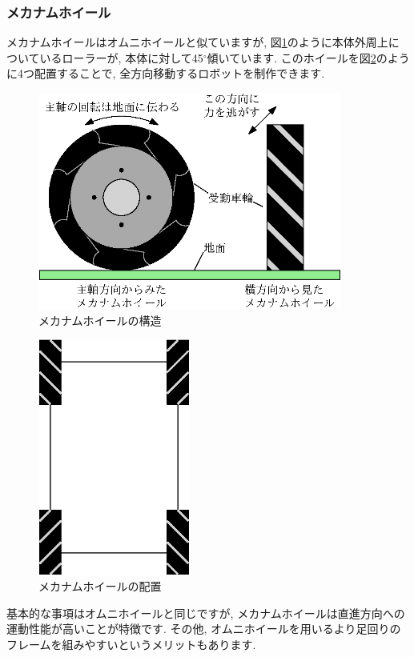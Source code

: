 \subsubsection{メカナムホイール}
メカナムホイールはオムニホイールと似ていますが, 図\ref{fig:mechanum_round}のように本体外周上についているローラーが, 本体に対して45$^{\circ}$傾いています. このホイールを図\ref{fig:mechanum}のように4つ配置することで, 全方向移動するロボットを制作できます. 

\begin{figure}[h]
  \centering
  \includegraphics[width=10cm]{mecha/fig/mecanum.eps}
  \caption{メカナムホイールの構造}
  \label{fig:mechanum_round}
\end{figure}

\begin{figure}[h]
  \centering
  \includegraphics[width=5cm]{mecha/fig/fiji_mechanam.eps}
  \caption{メカナムホイールの配置}
  \label{fig:mechanum}
\end{figure}
基本的な事項はオムニホイールと同じですが, メカナムホイールは直進方向への運動性能が高いことが特徴です. その他, オムニホイールを用いるより足回りのフレームを組みやすいというメリットもあります. 

